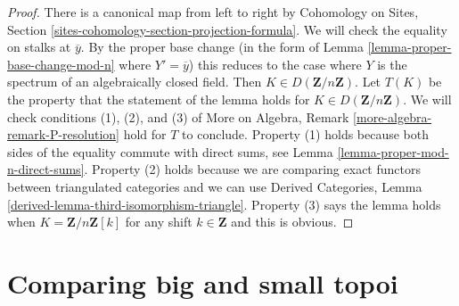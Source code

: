 \begin{proof}
There is a canonical map from left to right by
Cohomology on Sites, Section \ref{sites-cohomology-section-projection-formula}.
We will check the equality on stalks at $\overline{y}$.
By the proper base change (in the form of
Lemma \ref{lemma-proper-base-change-mod-n} where $Y' = \overline{y}$)
this reduces to the case where $Y$ is the spectrum of
an algebraically closed field. Then $K \in D(\mathbf{Z}/n\mathbf{Z})$.
Let $T(K)$ be the property that the statement of the
lemma holds for $K \in D(\mathbf{Z}/n\mathbf{Z})$.
We will check conditions (1), (2), and (3) of
More on Algebra, Remark \ref{more-algebra-remark-P-resolution}
hold for $T$ to conclude.
Property (1) holds because both sides of the equality
commute with direct sums, see
Lemma \ref{lemma-proper-mod-n-direct-sums}.
Property (2) holds because we are comparing exact functors
between triangulated categories and we can use
Derived Categories, Lemma \ref{derived-lemma-third-isomorphism-triangle}.
Property (3) says the lemma holds when $K = \mathbf{Z}/n\mathbf{Z}[k]$
for any shift $k \in \mathbf{Z}$ and this is obvious.
\end{proof}





















\section{Comparing big and small topoi}
\label{section-compare}

